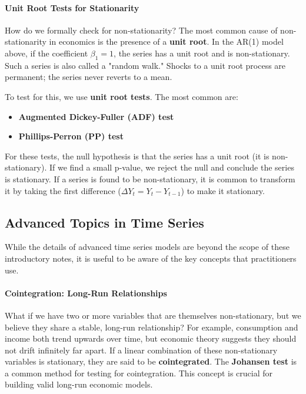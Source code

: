 \documentclass{article}
\providecommand{\tightlist}{
  \setlength{\itemsep}{0pt}
  \setlength{\parskip}{0pt}}
\begin{document}
\paragraph{Unit Root Tests for Stationarity}
How do we formally check for non-stationarity? The most common cause of non-stationarity in economics is the presence of a \textbf{unit root}. In the AR(1) model above, if the coefficient $\beta_1=1$, the series has a unit root and is non-stationary. Such a series is also called a "random walk." Shocks to a unit root process are permanent; the series never reverts to a mean.

To test for this, we use \textbf{unit root tests}. The most common are:
\begin{itemize}
    \tightlist
    \item \textbf{Augmented Dickey-Fuller (ADF) test}
    \item \textbf{Phillips-Perron (PP) test}
\end{itemize}
For these tests, the null hypothesis is that the series has a unit root (it is non-stationary). If we find a small p-value, we reject the null and conclude the series is stationary. If a series is found to be non-stationary, it is common to transform it by taking the first difference ($\Delta Y_t = Y_t - Y_{t-1}$) to make it stationary.

\subsection{Advanced Topics in Time Series}
\label{sub:ts_advanced}

While the details of advanced time series models are beyond the scope of these introductory notes, it is useful to be aware of the key concepts that practitioners use.

\paragraph{Cointegration: Long-Run Relationships}
What if we have two or more variables that are themselves non-stationary, but we believe they share a stable, long-run relationship? For example, consumption and income both trend upwards over time, but economic theory suggests they should not drift infinitely far apart. If a linear combination of these non-stationary variables is stationary, they are said to be \textbf{cointegrated}. The \textbf{Johansen test} is a common method for testing for cointegration. This concept is crucial for building valid long-run economic models.
\end{document}
